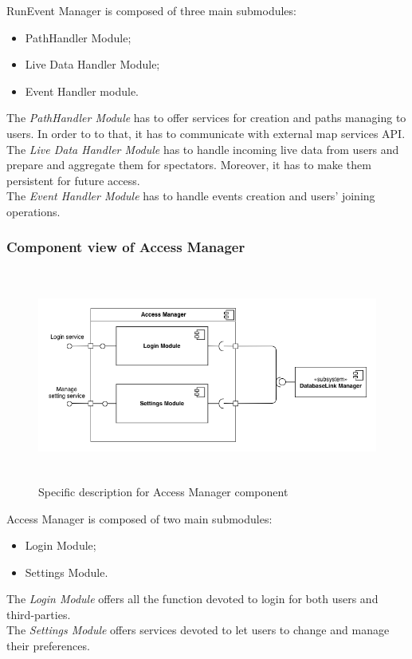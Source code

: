 \documentclass[DD.tex]{subfiles}
\begin{document}
RunEvent Manager is composed of three main submodules: \begin{itemize}
	\item PathHandler Module;
	\item Live Data Handler Module;
	\item Event Handler module.
\end{itemize}

The \textit{PathHandler Module} has to offer services for creation and paths managing to users. In order to to that, it has to communicate with external map services API.\\
The \textit{Live Data Handler Module} has to handle incoming live data from users and prepare and aggregate them for spectators. Moreover, it has to make them persistent for future access.\\
The \textit{Event Handler Module} has to handle events creation and users' joining operations.

\newpage
\subsubsection{Component view of Access Manager}
\begin{figure}[h!]
	\centering
	\includegraphics[height=7.00cm,keepaspectratio]{Figures/AccessManagerComponent}
	\caption{Specific description for Access Manager component}
\end{figure}

Access Manager is composed of two main submodules: 
\begin{itemize}
	\item Login Module;
	\item Settings Module.
\end{itemize}

The \textit{Login Module} offers all the function devoted to login for both users and third-parties.\\
The \textit{Settings Module} offers services devoted to let users to change and manage their preferences.
\end{document}
